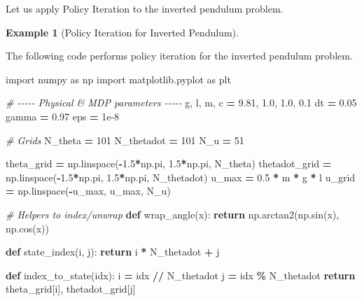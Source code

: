\documentclass[
]{book}
\newenvironment{Shaded}{\begin{snugshade}}{\end{snugshade}}
\newcommand{\CommentTok}[1]{\textcolor[rgb]{0.56,0.35,0.01}{\textit{#1}}}
\newcommand{\ControlFlowTok}[1]{\textcolor[rgb]{0.13,0.29,0.53}{\textbf{#1}}}
\newcommand{\DecValTok}[1]{\textcolor[rgb]{0.00,0.00,0.81}{#1}}
\newcommand{\FloatTok}[1]{\textcolor[rgb]{0.00,0.00,0.81}{#1}}
\newcommand{\ImportTok}[1]{#1}
\newcommand{\KeywordTok}[1]{\textcolor[rgb]{0.13,0.29,0.53}{\textbf{#1}}}
\newcommand{\NormalTok}[1]{#1}
\newcommand{\OperatorTok}[1]{\textcolor[rgb]{0.81,0.36,0.00}{\textbf{#1}}}
\theoremstyle{definition}
\theoremstyle{definition}
\newtheorem{example}{Example}[chapter]
\theoremstyle{definition}
\theoremstyle{definition}
\theoremstyle{remark}
\begin{document}
Let us apply Policy Iteration to the inverted pendulum problem.

\begin{example}[Policy Iteration for Inverted Pendulum]
\protect\hypertarget{exm:InvertedPendulumPolicyIteration}{}\label{exm:InvertedPendulumPolicyIteration}

The following code performs policy iteration for the inverted pendulum problem.

\begin{Shaded}
\begin{Highlighting}[]
\ImportTok{import}\NormalTok{ numpy }\ImportTok{as}\NormalTok{ np}
\ImportTok{import}\NormalTok{ matplotlib.pyplot }\ImportTok{as}\NormalTok{ plt}

\CommentTok{\# {-}{-}{-}{-}{-} Physical \& MDP parameters {-}{-}{-}{-}{-}}
\NormalTok{g, l, m, c }\OperatorTok{=} \FloatTok{9.81}\NormalTok{, }\FloatTok{1.0}\NormalTok{, }\FloatTok{1.0}\NormalTok{, }\FloatTok{0.1}
\NormalTok{dt }\OperatorTok{=} \FloatTok{0.05}
\NormalTok{gamma }\OperatorTok{=} \FloatTok{0.97}
\NormalTok{eps }\OperatorTok{=} \FloatTok{1e{-}8}

\CommentTok{\# Grids}
\NormalTok{N\_theta }\OperatorTok{=} \DecValTok{101}
\NormalTok{N\_thetadot }\OperatorTok{=} \DecValTok{101}
\NormalTok{N\_u }\OperatorTok{=} \DecValTok{51}

\NormalTok{theta\_grid }\OperatorTok{=}\NormalTok{ np.linspace(}\OperatorTok{{-}}\FloatTok{1.5}\OperatorTok{*}\NormalTok{np.pi, }\FloatTok{1.5}\OperatorTok{*}\NormalTok{np.pi, N\_theta)}
\NormalTok{thetadot\_grid }\OperatorTok{=}\NormalTok{ np.linspace(}\OperatorTok{{-}}\FloatTok{1.5}\OperatorTok{*}\NormalTok{np.pi, }\FloatTok{1.5}\OperatorTok{*}\NormalTok{np.pi, N\_thetadot)}
\NormalTok{u\_max }\OperatorTok{=} \FloatTok{0.5} \OperatorTok{*}\NormalTok{ m }\OperatorTok{*}\NormalTok{ g }\OperatorTok{*}\NormalTok{ l}
\NormalTok{u\_grid }\OperatorTok{=}\NormalTok{ np.linspace(}\OperatorTok{{-}}\NormalTok{u\_max, u\_max, N\_u)}

\CommentTok{\# Helpers to index/unwrap}
\KeywordTok{def}\NormalTok{ wrap\_angle(x):}
    \ControlFlowTok{return}\NormalTok{ np.arctan2(np.sin(x), np.cos(x))}

\KeywordTok{def}\NormalTok{ state\_index(i, j):}
    \ControlFlowTok{return}\NormalTok{ i }\OperatorTok{*}\NormalTok{ N\_thetadot }\OperatorTok{+}\NormalTok{ j}

\KeywordTok{def}\NormalTok{ index\_to\_state(idx):}
\NormalTok{    i }\OperatorTok{=}\NormalTok{ idx }\OperatorTok{//}\NormalTok{ N\_thetadot}
\NormalTok{    j }\OperatorTok{=}\NormalTok{ idx }\OperatorTok{\%}\NormalTok{ N\_thetadot}
    \ControlFlowTok{return}\NormalTok{ theta\_grid[i], thetadot\_grid[j]}


\end{Highlighting}
\end{Shaded}
\end{example}
\end{document}
